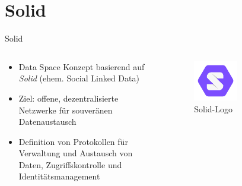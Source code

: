 
\section{Solid}


\begin{frame}{Solid \footnotesize\cite{mecklerWebLinkedData2023}}
    \begin{columns}
        \begin{column}{0.6\textwidth}
            \begin{itemize}
                \item Data Space Konzept basierend auf\\
                    \emph{Solid} (ehem. Social Linked Data)
                \item<2-> Ziel: offene, dezentralisierte Netzwerke für souveränen Datenaustausch
                \item<3-> Definition von Protokollen für Verwaltung und Austausch von Daten, Zugriffskontrolle und Identitätsmanagement
            \end{itemize}
        \end{column}
        
        \begin{column}{0.4\textwidth}
            \begin{figure}
                \includegraphics[width=0.5\textwidth]{./assets/solid_logo.pdf}
                \caption{Solid-Logo~\cite{solidcommunitygroupSolidemblemsvg2019}}
            \end{figure}
        \end{column}
    \end{columns}
\end{frame}


